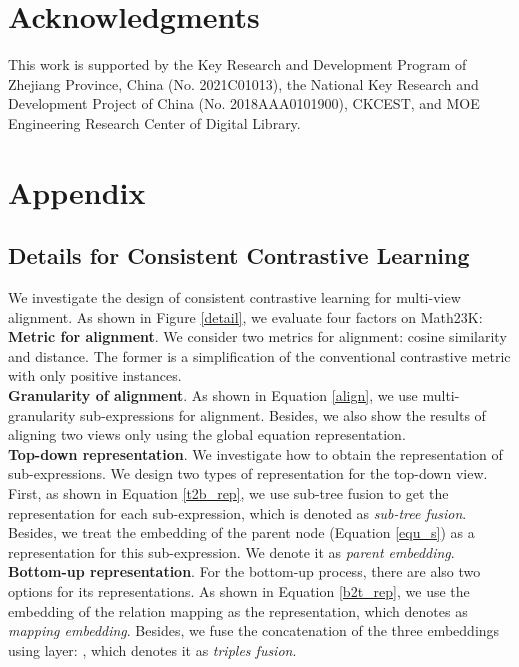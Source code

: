 \documentclass[11pt]{article}
\begin{document}
\section*{Acknowledgments}
This work is supported by the Key Research and Development Program of Zhejiang Province, China (No. 2021C01013), the National Key Research and Development Project of China (No. 2018AAA0101900), CKCEST, and MOE Engineering Research Center of Digital Library.



\appendix
\clearpage
\renewcommand\thefigure{\Alph{section}\arabic{figure}}    
\setcounter{figure}{0}    
\section{Appendix}
\label{sec:appendix}
\subsection{Details for Consistent Contrastive Learning}
We investigate the design of consistent contrastive learning for multi-view alignment. As shown in Figure \ref{detail}, we evaluate four factors on Math23K:\\ 
\indent \textbf{Metric for alignment}. We consider two metrics for alignment: cosine similarity and  distance. The former is a simplification of the conventional contrastive metric with only positive instances.\\
\indent \textbf{Granularity of alignment}. As shown in Equation \ref{align}, we use multi-granularity sub-expressions for alignment. Besides, we also show the results of aligning two views only using the global equation representation.\\
\indent \textbf{Top-down representation}. We investigate how to obtain the representation of sub-expressions. We design two types of representation for the top-down view. First, as shown in Equation \ref{t2b_rep}, we use sub-tree fusion to get the representation for each sub-expression, which is denoted as \emph{sub-tree fusion}. Besides, we treat the embedding of the parent node  (Equation \ref{equ_s}) as a representation for this sub-expression. We denote it as \emph{parent embedding}.\\ 
\indent \textbf{Bottom-up representation}. For the bottom-up process, there are also two options for its representations. As shown in Equation \ref{b2t_rep}, we use the embedding of the relation mapping as the representation, which denotes as \emph{mapping embedding}. Besides, we fuse the concatenation of the three embeddings using  layer: , which denotes it as \emph{triples fusion}. 
\end{document}
